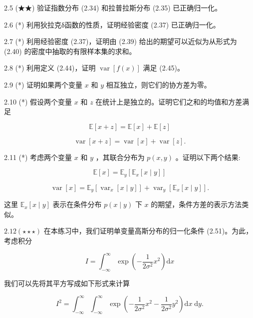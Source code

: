 \documentclass[10pt]{report}
\begin{document}
2.5 (★★) 验证指数分布 (2.34) 和拉普拉斯分布 (2.35) 已正确归一化。

2.6 (*) 利用狄拉克δ函数的性质，证明经验密度 (2.37) 已正确归一化。

2.7 (*) 利用经验密度 (2.37)，证明由 (2.39) 给出的期望可以近似为从形式为 (2.40) 的密度中抽取的有限样本集的求和。

2.8 (*) 利用定义 (2.44)，证明 \(\operatorname{var}\left\lbrack  {f\left( x\right) }\right\rbrack\) 满足 (2.45)。

2.9 (*) 证明如果两个变量 \(x\) 和 \(y\) 相互独立，则它们的协方差为零。

2.10 (*) 假设两个变量 \(x\) 和 \(z\) 在统计上是独立的。证明它们之和的均值和方差满足

\[
\mathbb{E}\left\lbrack  {x + z}\right\rbrack   = \mathbb{E}\left\lbrack  x\right\rbrack   + \mathbb{E}\left\lbrack  z\right\rbrack   \tag{2.120}
\]

\[
\operatorname{var}\left\lbrack  {x + z}\right\rbrack   = \operatorname{var}\left\lbrack  x\right\rbrack   + \operatorname{var}\left\lbrack  z\right\rbrack  . \tag{2.121}
\]

2.11 (*) 考虑两个变量 \(x\) 和 \(y\) ，其联合分布为 \(p\left( {x,y}\right)\) 。证明以下两个结果:

\[
\mathbb{E}\left\lbrack  x\right\rbrack   = {\mathbb{E}}_{y}\left\lbrack  {{\mathbb{E}}_{x}\left\lbrack  {x \mid  y}\right\rbrack  }\right\rbrack   \tag{2.122}
\]

\[
\operatorname{var}\left\lbrack  x\right\rbrack   = {\mathbb{E}}_{y}\left\lbrack  {{\operatorname{var}}_{x}\left\lbrack  {x \mid  y}\right\rbrack  }\right\rbrack   + {\operatorname{var}}_{y}\left\lbrack  {{\mathbb{E}}_{x}\left\lbrack  {x \mid  y}\right\rbrack  }\right\rbrack  . \tag{2.123}
\]

这里 \({\mathbb{E}}_{x}\left\lbrack  {x \mid  y}\right\rbrack\) 表示在条件分布 \(p\left( {x \mid  y}\right)\) 下 \(x\) 的期望，条件方差的表示方法类似。

\({2.12}\left( {\star  \star   \star  }\right)\) 在本练习中，我们证明单变量高斯分布的归一化条件 (2.51)。为此，考虑积分

\[
I = {\int }_{-\infty }^{\infty }\exp \left( {-\frac{1}{2{\sigma }^{2}}{x}^{2}}\right) \mathrm{d}x \tag{2.124}
\]

我们可以先将其平方写成如下形式来计算

\[
{I}^{2} = {\int }_{-\infty }^{\infty }{\int }_{-\infty }^{\infty }\exp \left( {-\frac{1}{2{\sigma }^{2}}{x}^{2} - \frac{1}{2{\sigma }^{2}}{y}^{2}}\right) \mathrm{d}x\mathrm{\;d}y. \tag{2.125}
\]
\end{document}
